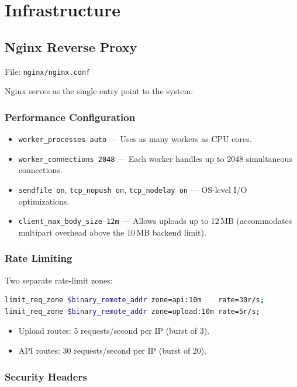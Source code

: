 \documentclass[12pt, a4paper]{report}
\begin{document}
\chapter{Infrastructure}

\section{Nginx Reverse Proxy}

File: \texttt{nginx/nginx.conf}

Nginx serves as the single entry point to the system:

\subsection{Performance Configuration}
\begin{itemize}
    \item \texttt{worker\_processes auto} — Uses as many workers as CPU cores.
    \item \texttt{worker\_connections 2048} — Each worker handles up to 2048
          simultaneous connections.
    \item \texttt{sendfile on}, \texttt{tcp\_nopush on}, \texttt{tcp\_nodelay on}
          — OS-level I/O optimizations.
    \item \texttt{client\_max\_body\_size 12m} — Allows uploads up to 12\,MB
          (accommodates multipart overhead above the 10\,MB backend limit).
\end{itemize}

\subsection{Rate Limiting}

Two separate rate-limit zones:
\begin{lstlisting}[language=bash, caption={Nginx rate limiting configuration.}]
limit_req_zone $binary_remote_addr zone=api:10m    rate=30r/s;
limit_req_zone $binary_remote_addr zone=upload:10m rate=5r/s;
\end{lstlisting}

\begin{itemize}
    \item Upload routes: 5 requests/second per IP (burst of 3).
    \item API routes: 30 requests/second per IP (burst of 20).
\end{itemize}

\subsection{Security Headers}
\end{document}
